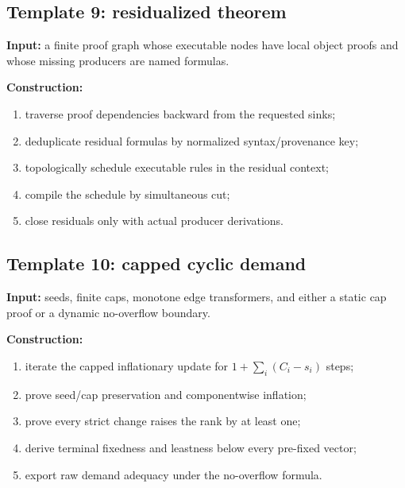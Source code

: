 \subsection{Template 9: residualized theorem}

\textbf{Input:} a finite proof graph whose executable nodes have local object
proofs and whose missing producers are named formulas.

\textbf{Construction:}
\begin{enumerate}[label=(\arabic*)]
  \item traverse proof dependencies backward from the requested sinks;
  \item deduplicate residual formulas by normalized syntax/provenance key;
  \item topologically schedule executable rules in the residual context;
  \item compile the schedule by simultaneous cut;
  \item close residuals only with actual producer derivations.
\end{enumerate}

\subsection{Template 10: capped cyclic demand}

\textbf{Input:} seeds, finite caps, monotone edge transformers, and either a
static cap proof or a dynamic no-overflow boundary.

\textbf{Construction:}
\begin{enumerate}[label=(\arabic*)]
  \item iterate the capped inflationary update for
    \(1+\sum_i(C_i-s_i)\) steps;
  \item prove seed/cap preservation and componentwise inflation;
  \item prove every strict change raises the rank by at least one;
  \item derive terminal fixedness and leastness below every pre-fixed vector;
  \item export raw demand adequacy under the no-overflow formula.
\end{enumerate}
